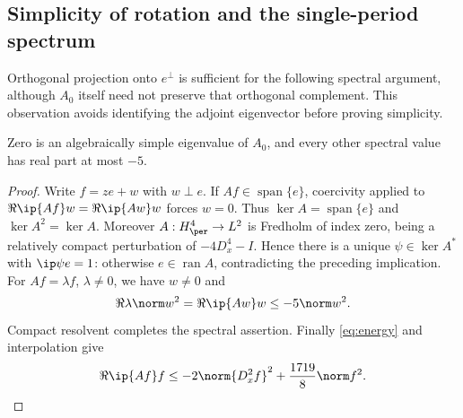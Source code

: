 \subsection{Simplicity of rotation and the single-period spectrum}
Orthogonal projection onto $e^\perp$ is sufficient for the following spectral argument, although $A_0$ itself need not preserve that orthogonal complement. This observation avoids identifying the adjoint eigenvector before proving simplicity.
\begin{proposition}\label{prop:single-spectrum}
Zero is an algebraically simple eigenvalue of $A_0$, and every other spectral value has real part at most $-5$.
\end{proposition}
\begin{proof}
Write $f=ze+w$ with $w\perp e$. If $Af\in\operatorname{span}\{e\}$, coercivity applied to $\Re\ip{Af}w=\Re\ip{Aw}w$ forces $w=0$. Thus $\ker A=\operatorname{span}\{e\}$ and $\ker A^2=\ker A$. Moreover $A:H^4_\per\to L^2$ is Fredholm of index zero, being a relatively compact perturbation of $-4D_x^4-I$. Hence there is a unique $\psi\in\ker A^*$ with $\ip\psi e=1$: otherwise $e\in\operatorname{ran}A$, contradicting the preceding implication. For $Af=\lambda f$, $\lambda\ne0$, we have $w\ne0$ and
\[
 \Re\lambda\norm w^2=\Re\ip{Aw}w\le-5\norm w^2.
\]
Compact resolvent completes the spectral assertion. Finally \eqref{eq:energy} and interpolation give
\begin{equation}\label{eq:interpolation}
 \Re\ip{Af}f\le-2\norm{D_x^2f}^2+\frac{1719}{8}\norm f^2.
\end{equation}
\end{proof}
